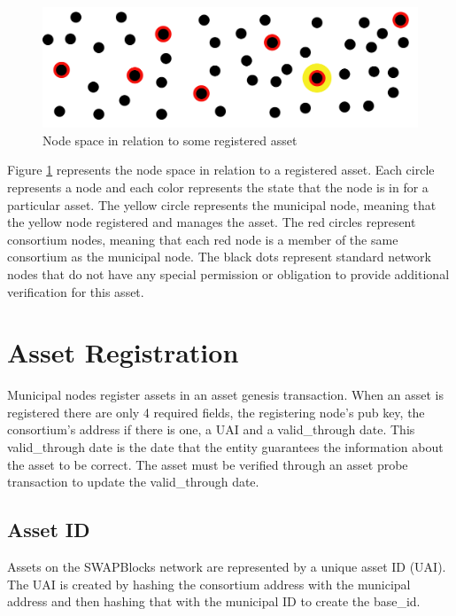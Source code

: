 \documentclass[12pt]{article}
\begin{document}
\begin{figure}[h]
	\centering
	\includegraphics[width=.85\textwidth]{node_space}
	\caption{Node space in relation to some registered asset}
	\label{fig:nodespace1}
\end{figure}


Figure \ref{fig:nodespace1} represents the node space in relation to a registered asset.
Each circle represents a node and each color represents the state that the
node is in for a particular asset.  The yellow circle represents the municipal node, meaning
that the yellow node registered and manages the asset.  The red circles represent consortium 
nodes, meaning that each red node is a member of the same consortium as the municipal node.
The black dots represent standard network nodes that do not have any special permission or
obligation to provide additional verification for this asset.






\section{Asset Registration}

Municipal nodes register assets in an asset genesis transaction.  When 
an asset is registered there are only 4 required fields, the registering node's 
pub key, the consortium's address if there is one, a UAI and a valid\_through date.  
This valid\_through date is the date that the entity guarantees the information 
about the asset to be correct.  The asset must be verified through an asset probe 
transaction to update the valid\_through date.

\subsection{Asset ID}

Assets on the SWAPBlocks network are represented by a unique asset ID (UAI).  
The UAI is created by hashing the consortium address with the municipal address 
and then hashing that with the municipal ID to create the base\_id.
\end{document}
